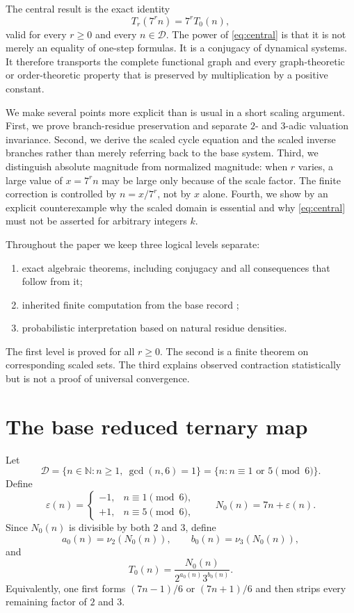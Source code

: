 \documentclass[11pt]{article}
\newcommand{\N}{\mathbb{N}}
\newcommand{\eps}{\varepsilon}
\begin{document}
The central result is the exact identity
\begin{equation}
T_r(7^rn)=7^rT_0(n),
\label{eq:central}
\end{equation}
valid for every $r\ge0$ and every $n\in\mathcal D$. The power of \eqref{eq:central} is that it is not merely an equality of one-step formulas. It is a conjugacy of dynamical systems. It therefore transports the complete functional graph and every graph-theoretic or order-theoretic property that is preserved by multiplication by a positive constant.

We make several points more explicit than is usual in a short scaling argument. First, we prove branch-residue preservation and separate $2$- and $3$-adic valuation invariance. Second, we derive the scaled cycle equation and the scaled inverse branches rather than merely referring back to the base system. Third, we distinguish absolute magnitude from normalized magnitude: when $r$ varies, a large value of $x=7^rn$ may be large only because of the scale factor. The finite correction is controlled by $n=x/7^r$, not by $x$ alone. Fourth, we show by an explicit counterexample why the scaled domain is essential and why \eqref{eq:central} must not be asserted for arbitrary integers $k$.

Throughout the paper we keep three logical levels separate:
\begin{enumerate}[label=(\roman*)]
\item exact algebraic theorems, including conjugacy and all consequences that follow from it;
\item inherited finite computation from the base record \cite{Base7Paper};
\item probabilistic interpretation based on natural residue densities.
\end{enumerate}
The first level is proved for all $r\ge0$. The second is a finite theorem on corresponding scaled sets. The third explains observed contraction statistically but is not a proof of universal convergence.

\section{The base reduced ternary map}
Let
\begin{equation}
\mathcal D=\{n\in\N:n\ge1,\ \gcd(n,6)=1\}=\{n:n\equiv1\text{ or }5\pmod6\}.
\label{eq:D}
\end{equation}
Define
\begin{equation}
\eps(n)=\begin{cases}
-1,&n\equiv1\pmod6,\\
+1,&n\equiv5\pmod6,
\end{cases}
\qquad N_0(n)=7n+\eps(n).
\label{eq:epsbase}
\end{equation}
Since $N_0(n)$ is divisible by both $2$ and $3$, define
\[
a_0(n)=\nu_2(N_0(n)),\qquad b_0(n)=\nu_3(N_0(n)),
\]
and
\begin{equation}
T_0(n)=\frac{N_0(n)}{2^{a_0(n)}3^{b_0(n)}}.
\label{eq:T0}
\end{equation}
Equivalently, one first forms $(7n-1)/6$ or $(7n+1)/6$ and then strips every remaining factor of $2$ and $3$.
\end{document}
